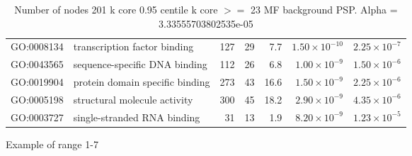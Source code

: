 \begin{table}[ht]
\begin{adjustbox}{width=\textwidth}
\begin{tabular}{llrrrrr}
  GO:0008134 & transcription factor binding & 127 & 29 & 7.7 & $1.50 \times 10^{-10}$ & $2.25 \times 10^{-7}$ \\ 
  GO:0043565 & sequence-specific DNA binding & 112 & 26 & 6.8 & $1.00 \times 10^{-9}$ & $1.50 \times 10^{-6}$ \\ 
  GO:0019904 & protein domain specific binding & 273 & 43 & 16.6 & $1.50 \times 10^{-9}$ & $2.25 \times 10^{-6}$ \\ 
  GO:0005198 & structural molecule activity & 300 & 45 & 18.2 & $2.90 \times 10^{-9}$ & $4.35 \times 10^{-6}$ \\ 
  GO:0003727 & single-stranded RNA binding & 31 & 13 & 1.9 & $8.20 \times 10^{-9}$ & $1.23 \times 10^{-5}$ \\ 
   \hline
\end{tabular}
\end{adjustbox}
\caption{Number of nodes 201 k core 0.95 centile  k core $>=$ 23 MF background PSP. Alpha = 3.33555703802535e-05} 
\label{tab:Number of nodes 201 k core 0.95 centile  k core $>=$ 23 MF background PSP. Alpha = 3.33555703802535e-05}
\end{table}

Example of range 1-7

